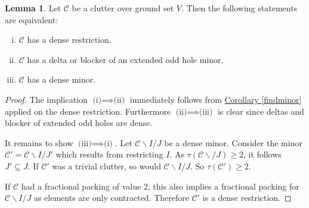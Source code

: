\documentclass[a4paper, 12pt]{scrbook}
\theoremstyle{definition}
\newtheorem{lemma}[theorem]{Lemma}
\begin{document}
   \begin{lemma}
       Let $\mathcal{C}$ be a clutter over ground set $V$. Then the following statements are equivalent:
       \leavevmode
       \begin{enumerate}[(i)]
           \item $\mathcal{C}$ has a dense restriction.
           \item $\mathcal{C}$ has a delta or blocker of an extended odd hole minor.
           \item $\mathcal{C}$ has a dense minor.
       \end{enumerate}
   \end{lemma}

   \begin{proof}
       The implication $\text{(i)} \implies \text{(ii)}$ immediately follows from \hyperref[findminor]{Corollary \ref*{findminor}} applied on the dense restriction. Furthermore $\text{(ii)} \implies \text{(iii)}$ is clear since deltas and blocker of extended odd holes are dense.

       It remains to show $\text{(iii)} \implies \text{(i)}$. Let $\mathcal{C} \backslash I /J$ be a dense minor. Consider the minor $\mathcal{C'}=\mathcal{C}\backslash I/J'$ which results from restricting $I$. As $\tau(\mathcal{C}\backslash /J)\geq 2$, it follows $J' \subseteq J$. If $\mathcal{C'}$ was a trivial clutter, so would $\mathcal{C} \backslash I/J$. So $\tau(\mathcal{C'})\geq 2$.

       If $\mathcal{C}$ had a fractional packing of value 2, this also implies a fractional packing for $\mathcal{C}\backslash I/J$ as elements are only contracted. Therefore $\mathcal{C'}$ is a dense restriction.
   \end{proof}


   \printbibliography[title={References}]
   \printindex
\end{document}
